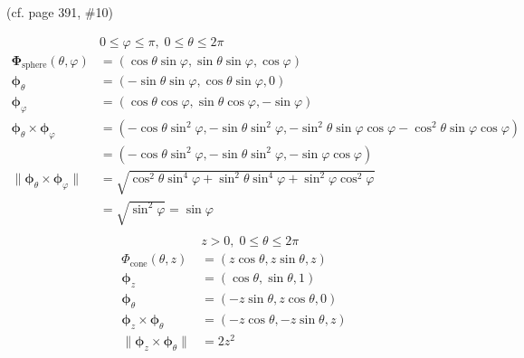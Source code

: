 \documentclass{article}
\newcommand{\norm}[1]{\| #1 \|}
\begin{document}
\begin{enumerate}
\begin{enumerate}
        (cf. page 391, \#10)

        \begin{align*} 
            & 0 \leq \varphi \leq \pi , \; 0 \leq \theta \leq 2\pi \\
            \boldsymbol \Phi_{\text{sphere}} (\theta, \varphi) &= (\cos \theta \sin \varphi, \sin \theta \sin \varphi, \cos \varphi) \\
            \boldsymbol \phi_{\theta} &= (- \sin \theta \sin \varphi, \cos \theta \sin \varphi, 0)\\
            \boldsymbol \phi_{\varphi} &= (\cos \theta \cos \varphi, \sin \theta \cos \varphi, -\sin \varphi) \\
            \boldsymbol \phi_\theta \times \boldsymbol \phi_\varphi &= (-\cos\theta \sin^2\varphi, -\sin\theta \sin^2\varphi, - \sin^2\theta \sin\varphi \cos\varphi - \cos^2\theta \sin \varphi \cos \varphi) \\ 
            &= (-\cos\theta \sin^2\varphi, -\sin\theta \sin^2\varphi, - \sin\varphi \cos\varphi ) \\ 
            \norm {\boldsymbol \phi_\theta \times \boldsymbol \phi_\varphi} &= \sqrt{\cos^2\theta \sin^4\varphi + \sin^2\theta \sin^4\varphi + \sin^2\varphi \cos^2\varphi } \\ 
            &= \sqrt{\sin^2\varphi } = \sin\varphi \\
        \end{align*}
        \begin{align*} 
            & z > 0 , \; 0 \leq \theta \leq 2\pi \\
            \Phi_{\text{cone}} (\theta, z) &= (z\cos \theta , z\sin \theta, z)  \\
            \boldsymbol \phi_{z} &= (\cos \theta, \sin \theta, 1) \\
            \boldsymbol \phi_{\theta} &= (-z \sin \theta, z\cos \theta, 0) \\
            \boldsymbol \phi_{z} \times \boldsymbol \phi_{\theta} &= (-z\cos \theta, -z\sin \theta, z)  \\
            \norm{\boldsymbol \phi_{z} \times \boldsymbol \phi_{\theta}} &= 2z^2  \\
        \end{align*}
        

\end{enumerate}
\end{enumerate}
\end{document}
